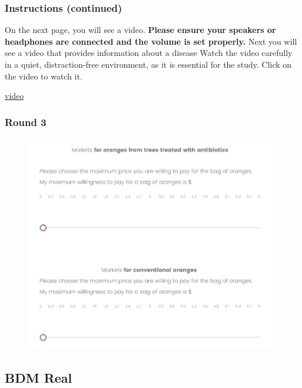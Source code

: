 \documentclass[12pt]{article}
\begin{document}
\clearpage

\subsubsection*{\textbf{Instructions (continued)}}
On the next page, you will see a video. \textbf{Please ensure your speakers or headphones are connected and the volume is set properly.} Next you will see a video that provides information about a disease Watch the video carefully in a quiet, distraction-free environment, as it is essential for the study.
\vspace{0.5cm}
Click on the video to watch it.

\href{https://www.youtube.com/watch?v=_AqMBjB0ChM}{video}
\clearpage


 \subsubsection*{\centering Round 3}


\begin{figure}[H]
    \centering
    \includegraphics[width=\linewidth]{BDM_market.jpg}
    \caption{}
    \label{fig:BDM_market}
\end{figure}

\clearpage



\subsection{BDM Real}
\end{document}
